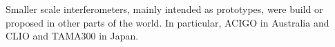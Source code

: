 Smaller scale interferometers, mainly intended as prototypes, were build or 
proposed in other parts of the world. In particular, ACIGO in Australia and 
CLIO and TAMA300 in Japan.

